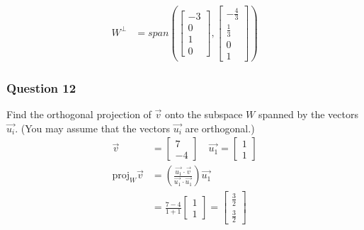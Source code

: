 \documentclass{math}
\begin{document}
\begin{align*}
  W^{\bot} &= span\left(
    \begin{bmatrix}-3 \\ 0 \\ 1 \\ 0\end{bmatrix},
    \begin{bmatrix}-\frac{4}{3} \\ \frac{1}{3} \\ 0 \\ 1\end{bmatrix}
  \right)
\end{align*}

\subsubsection*{Question 12}
Find the orthogonal projection of \( \vec{v} \) onto the subspace \( W \)
spanned by the vectors \( \vec{u_i} \). (You may assume that the vectors
\( \vec{u_i} \) are orthogonal.)
\begin{align*}
  \vec{v} &= \begin{bmatrix}7 \\ -4\end{bmatrix} \quad
    \vec{u_1} = \begin{bmatrix}1 \\ 1\end{bmatrix} \\
  \text{proj}_{W}\vec{v} &=
    \left(\frac{\vec{u_1}\cdot\vec{v}}{\vec{u_1}\cdot\vec{u_1}}\right)
    \vec{u_1} \\
  &= \frac{7-4}{1+1}\begin{bmatrix}1 \\ 1\end{bmatrix}
    = \begin{bmatrix}\frac{3}{2} \\ \frac{3}{2}\end{bmatrix}
\end{align*}
\end{document}

